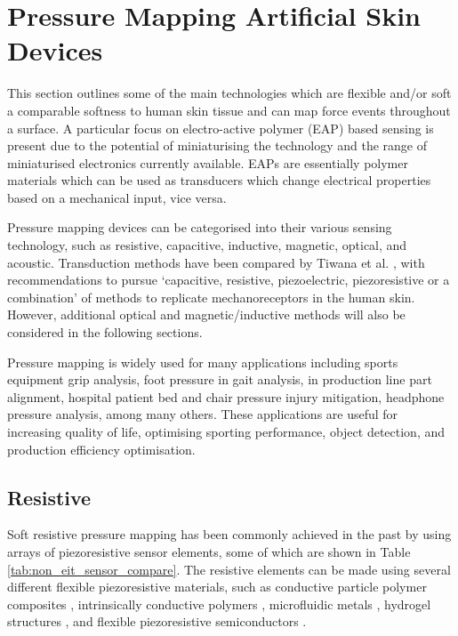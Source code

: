 \section{Pressure Mapping Artificial Skin Devices}
This section outlines some of the main technologies which are flexible and/or soft a comparable softness to human skin tissue and can map force events throughout a surface. A particular focus on electro-active polymer (EAP) based sensing is present due to the potential of miniaturising the technology and the range of miniaturised electronics currently available. EAPs are essentially polymer materials which can be used as transducers which change electrical properties based on a mechanical input, vice versa.

Pressure mapping devices can be categorised into their various sensing technology, such as resistive, capacitive, inductive, magnetic, optical, and acoustic. Transduction methods have been compared by Tiwana et al. \cite{Tiwana2012}, with recommendations to pursue `capacitive, resistive, piezoelectric, piezoresistive or a combination' of methods to replicate mechanoreceptors in the human skin. However, additional optical and magnetic/inductive methods will also be considered in the following sections.

Pressure mapping is widely used for many applications including sports equipment grip analysis, foot pressure in gait analysis, in production line part alignment, hospital patient bed and chair pressure injury mitigation, headphone pressure analysis, among many others. These applications are useful for increasing quality of life, optimising sporting performance, object detection, and production efficiency optimisation.

\subsection{Resistive}
Soft resistive pressure mapping has been commonly achieved in the past by using arrays of piezoresistive sensor elements, some of which are shown in Table \ref{tab:non_eit_sensor_compare}. The resistive elements can be made using several different flexible piezoresistive materials, such as conductive particle polymer composites \cite{Sun2020,Lu2014,Spahr2017}, intrinsically conductive polymers \cite{Lu2014,Hazelton2023,Mukherjee2023}, microfluidic metals \cite{Park2010,Jung2015,Kim2019}, hydrogel structures \cite{Yuk2016,Park2022,Chen2023}, and flexible piezoresistive semiconductors \cite{Xu2023,Sim2019}.

